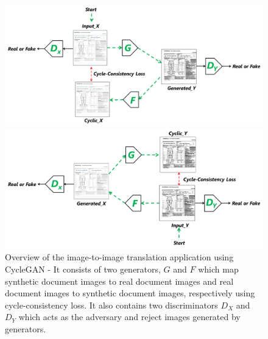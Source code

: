 \begin{figure}
  \centering
  \begin{minipage}[b]{1.1\textwidth}
    \includegraphics[width=\textwidth]{images/Methodology/Gxy.png}
  \end{minipage}
  \vfill
  \begin{minipage}[b]{1.1\textwidth}
    \includegraphics[width=\textwidth]{images/Methodology/Fyx.png}
  \end{minipage}
  \caption[Overview of the image-to-image translation application using \ac{CycleGAN} - It consists of two generators, $G$ and $F$ which map synthetic document images to real document images and real document images to synthetic document images, respectively using cycle-consistency loss \cite{zhu2020unpaired}. It also contains two discriminators $D_X$ and $D_Y$ which acts as the adversary and reject images generated by generators.]{Overview of the image-to-image translation application using \ac{CycleGAN} - It consists of two generators, $G$ and $F$ which map synthetic document images to real document images and real document images to synthetic document images, respectively using cycle-consistency loss\cite{zhu2020unpaired}. It also contains two discriminators $D_X$ and $D_Y$ which acts as the adversary and reject images generated by generators.}
  \label{fig:GxyFyx}
\end{figure}



